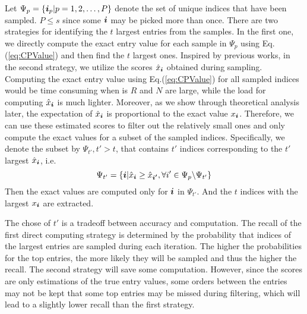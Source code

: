 \documentclass[letterpaper]{article}
\newcommand{\V}[1]{{\boldsymbol{{\MakeLowercase{#1}}}}}
\newcommand{\predx}{\hat{x}_{\V{i}}}
\newcommand{\Eqn}[1]{Eq.(\ref{eq:#1})}
\begin{document}
Let $\Psi_p = \{\V{i}_p|p = 1,2,\ldots,P\}$ 
denote the set of unique indices that have been sampled. 
$P\leq s$ since some $\V{i}$ may be picked more than once. 
There are two strategies for identifying the $t$ largest entries from the samples. 
In the first one, 
we directly compute the exact entry value for each sample in $\Psi_{p}$ using \Eqn{CPValue}
and then find the $t$ largest ones. 
Inspired by previous works, in the second strategy, 
we utilize the scores $\predx$ obtained during sampling. 
Computing the exact entry value using \Eqn{CPValue} for all sampled indices 
would be time consuming when is $R$ and $N$ are large, 
while the load for computing $\predx$ is much lighter. 
Moreover, as we show through theoretical analysis later, 
the expectation of $\predx$ is proportional to the exact value $x_{\V{i}}$. 
Therefore, we can use these estimated scores to filter out the relatively small ones 
and only compute the exact values for a subset of the sampled indices. 
Specifically, we denote the subset by $\Psi_{t'},t'>t$, 
that contains $t'$ indices corresponding to the $t'$ largest $\predx$, i.e.
\[
    \Psi_{t'} = \{ \V{i} | \predx \geq \hat{x}_{\V{i'}},
                           \forall i'\in \Psi_{p} \backslash \Psi_{t'}
                \}
\] 
Then the exact values  are computed only for $\V{i}$ in $\Psi_{t'}$. 
And the $t$ indices with the largest $x_{\V{i}}$ are extracted.

The chose of $t'$ is a tradeoff between accuracy and computation. 
The recall of the first direct computing strategy is determined by the probability 
that indices of the largest entries are sampled during each iteration. 
The higher the probabilities for the top entries, the more likely they will be sampled 
and thus the higher the recall. 
The second strategy will save some computation. 
However, since the scores are only estimations of the true entry values, 
some orders between the entries may not be kept 
that some top entries may be missed during filtering, 
which will lead to a slightly lower recall than the first strategy.
\end{document}

